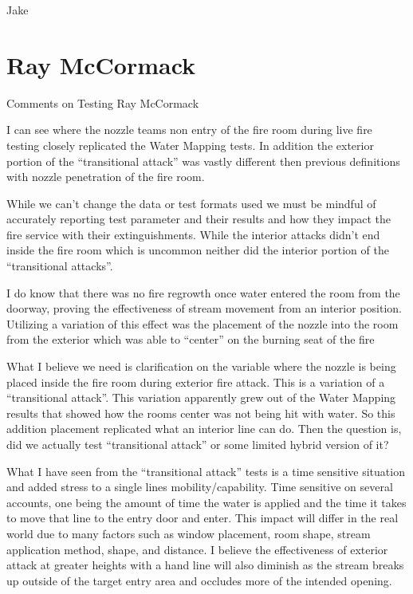 \documentclass[12pt,oneside]{book}
\begin{document}
\begin{appendix}
Jake

\section{Ray McCormack}

Comments on Testing
Ray McCormack

I can see where the nozzle teams non entry of the fire room during live fire testing closely replicated the Water Mapping tests. In addition the exterior portion of the ``transitional attack'' was vastly different then previous definitions with nozzle penetration of the fire room.

While we can't change the data or test formats used we must be mindful of accurately reporting test parameter and their results and how they impact the fire service with their extinguishments. While the interior attacks didn't end inside the fire room which is uncommon neither did the interior portion of the ``transitional attacks''.  

I do know that there was no fire regrowth once water entered the room from the doorway, proving the effectiveness of stream movement from an interior position. Utilizing a variation of this effect was the placement of the nozzle into the room from the exterior which was able to ``center'' on the burning seat of the fire

What I believe we need is clarification on the variable where the nozzle is being placed inside the fire room during exterior fire attack. This is a variation of a ``transitional attack''. This variation apparently grew out of the Water Mapping results that showed how the rooms center was not being hit with water. So this addition placement replicated what an interior line can do. Then the question is, did we actually test ``transitional attack'' or some limited hybrid version of it?

What I have seen from the ``transitional attack'' tests is a time sensitive situation and added stress to a single lines mobility/capability. Time sensitive on several accounts, one being the amount of time the water is applied and the time it takes to move that line to the entry door and enter. This impact will differ in the real world due to many factors such as window placement, room shape, stream application method, shape, and distance. I believe the effectiveness of exterior attack at greater heights with a hand line will also diminish as the stream breaks up outside of the target entry area and occludes more of the intended opening. 


\end{appendix}
\end{document}
